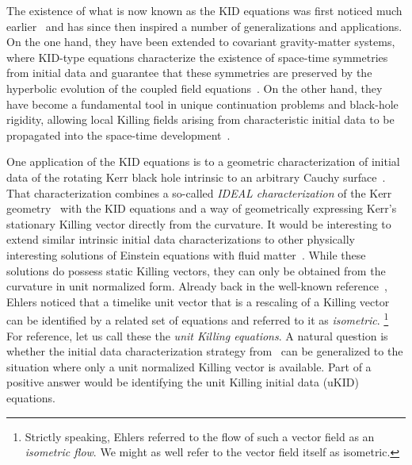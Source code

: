 \documentclass[a4paper]{article}
\theoremstyle{remark}
\begin{document}
The existence of what is now known as the KID equations was first
noticed much earlier~\cite{berezdivin, MONCRIEF-KID1, MONCRIEF-KID2,
COLL77} and has since then inspired a number of
generalizations and applications. On the one hand, they have been extended to covariant gravity-matter systems, where KID-type equations characterize the existence of space-time symmetries from initial data and guarantee that these symmetries are preserved by the hyperbolic evolution of the coupled field equations~\cite{Racz-1999, Racz-2001}. On the other hand, they have become a fundamental tool in unique continuation problems and black-hole rigidity, allowing local Killing fields arising from characteristic initial data to be propagated into the space-time development~\cite{Ionescu-Klainerman}.

One application of the KID equations is to a geometric characterization
of initial data of the rotating Kerr black hole intrinsic to an
arbitrary Cauchy surface~\cite{gp-kerrid}. That characterization
combines a so-called \emph{IDEAL characterization} of the Kerr
geometry~\cite{IDEAL-kerr} with the KID equations and a way of
geometrically expressing Kerr's stationary Killing vector directly from
the curvature. It would be interesting to extend similar intrinsic
initial data characterizations to other physically interesting solutions
of Einstein equations with fluid matter~\cite{Volkoff, Wyman}. While these
solutions do possess static Killing vectors, they can only be
obtained from the curvature in unit normalized form. Already back in the
well-known reference~\cite[(vi)]{ehlers-mech}, Ehlers
noticed that a timelike unit vector that is a rescaling of a Killing
vector can be identified by a related set of equations and referred to
it as \emph{isometric}.%
	\footnote{Strictly speaking, Ehlers referred to the flow of such a
	vector field as an \emph{isometric flow}. We might as well refer to
	the vector field itself as isometric.} %
For reference, let us call these the \emph{unit
Killing equations}. A natural question is whether the initial data
characterization strategy from~\cite{gp-kerrid} can be generalized to
the situation where only a unit normalized Killing vector is available.
Part of a positive answer would be identifying the unit Killing initial
data (uKID) equations.
\end{document}
